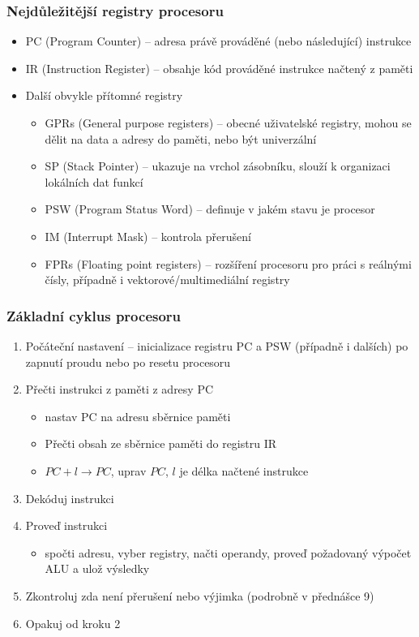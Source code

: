 \documentclass{beamer}
\begin{document}
\begin{frame}
\frametitle{Nejdůležitější registry procesoru}
\begin{itemize}
\item PC (Program Counter) -- adresa právě prováděné (nebo následující) instrukce
\item IR (Instruction Register) -- obsahje kód prováděné instrukce načtený z paměti
\item Další obvykle přítomné registry
\begin{itemize}
\item GPRs (General purpose registers) -- obecné uživatelské registry, mohou se dělit na data a adresy do paměti, nebo být univerzální
\item SP (Stack Pointer) -- ukazuje na vrchol zásobníku, slouží k organizaci lokálních dat funkcí
\item PSW (Program Status Word) -- definuje v jakém stavu je procesor
\item IM (Interrupt Mask) -- kontrola přerušení
\item FPRs (Floating point registers) -- rozšíření procesoru pro práci s reálnými čísly, případně i vektorové/multimediální registry
\end{itemize}
\end{itemize}
\end{frame}

\begin{frame}
\frametitle{Základní cyklus procesoru}
\begin{enumerate}
  \item Počáteční nastavení -- inicializace registru PC a PSW (případně i dalších) po zapnutí proudu nebo po resetu procesoru
  \item Přečti instrukci z paměti z adresy PC
  \begin{itemize}
    \item nastav PC na adresu sběrnice paměti
    \item Přečti obsah ze sběrnice paměti do registru IR
    \item $PC+l \to PC$, uprav $PC$, $l$ je délka načtené instrukce
  \end{itemize}
  \item Dekóduj instrukci
  \item Proveď instrukci
  \begin{itemize}
    \item spočti adresu, vyber registry, načti operandy, proveď požadovaný výpočet ALU a ulož výsledky
  \end{itemize}
  \item Zkontroluj zda není přerušení nebo výjimka (podrobně v přednášce 9)
  \item Opakuj od kroku 2
\end{enumerate}
\end{frame}
\end{document}
